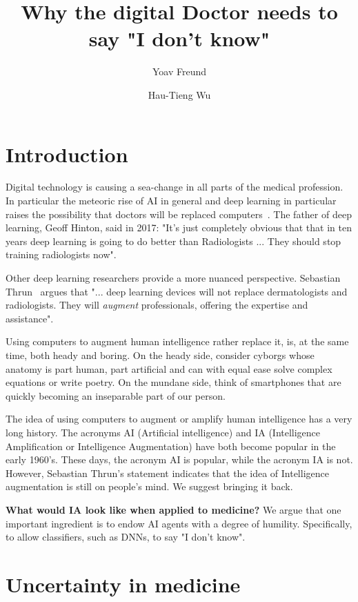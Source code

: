 \documentclass[fleqn,10pt]{wlscirep}
\title{Why the digital Doctor needs to say "I don't know"}
\author[1]{Yoav Freund}
\author[2]{Hau-Tieng Wu}
\affil[1]{UCSD, department, city, postcode, country}
\affil[2]{Duke, department, city, postcode, country}
\begin{document}
\flushbottom
\maketitle

\thispagestyle{empty}

\section*{Introduction}

Digital technology is causing a sea-change in all parts of the medical
profession. In particular the meteoric rise of AI in general and deep
learning in particular raises the possibility that doctors will be
replaced computers~\cite{Mukherjee2017}. The father of deep learning,
Geoff Hinton, said in 2017: "It's just completely obvious that that in
ten years deep learning is going to do better than Radiologists
... They should stop training radiologists now".

Other deep learning researchers provide a more nuanced
perspective. Sebastian
Thrun~\cite{Mukherjee2017,esteva2017dermatologist} argues that
"... deep learning devices will not replace dermatologists and
radiologists. They will {\em augment} professionals, offering the
expertise and assistance".

Using computers to augment human intelligence rather replace it, is,
at the same time, both heady and boring. On the heady side, consider
cyborgs whose anatomy is part human, part artificial and can with
equal ease solve complex equations or write poetry. On the mundane
side, think of smartphones that are quickly becoming an inseparable
part of our person.
 
The idea of using computers to augment or amplify human intelligence
has a very long history. The acronyms AI (Artificial intelligence) and
IA (Intelligence Amplification or Intelligence Augmentation) have both
become popular in the early
1960's\cite{ashby1957introduction,engelbart1962augmenting}. These
days, the acronym AI is popular, while the acronym IA is not. However,
Sebastian Thrun's statement indicates that the idea of Intelligence
augmentation is still on people's mind. We suggest bringing it back.

{\bf What would IA look like when applied to medicine?} We argue that
one important ingredient is to endow AI agents with a degree of
humility. Specifically, to allow classifiers, such as DNNs, to say "I
don't know".

\section*{Uncertainty in medicine}
\end{document}
